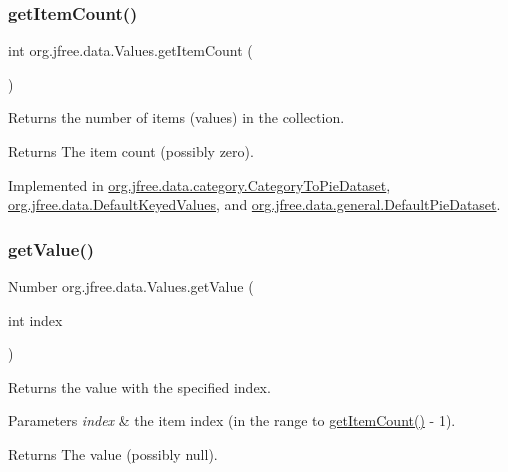 \subsubsection{\texorpdfstring{get\+Item\+Count()}{getItemCount()}}
{\footnotesize\ttfamily int org.\+jfree.\+data.\+Values.\+get\+Item\+Count (\begin{DoxyParamCaption}{ }\end{DoxyParamCaption})}

Returns the number of items (values) in the collection.

\begin{DoxyReturn}{Returns}
The item count (possibly zero). 
\end{DoxyReturn}


Implemented in \mbox{\hyperlink{classorg_1_1jfree_1_1data_1_1category_1_1_category_to_pie_dataset_a7536f863e26d692f65131df0ed9150c3}{org.\+jfree.\+data.\+category.\+Category\+To\+Pie\+Dataset}}, \mbox{\hyperlink{classorg_1_1jfree_1_1data_1_1_default_keyed_values_a82166915731034d230c83ee87177cd3b}{org.\+jfree.\+data.\+Default\+Keyed\+Values}}, and \mbox{\hyperlink{classorg_1_1jfree_1_1data_1_1general_1_1_default_pie_dataset_a4cf186a9f52bd58498c9f8551f0b5957}{org.\+jfree.\+data.\+general.\+Default\+Pie\+Dataset}}.

\mbox{\label{interfaceorg_1_1jfree_1_1data_1_1_values_a660d7e60de9e6ed7a3d2c22eb6578ced}} 
\subsubsection{\texorpdfstring{get\+Value()}{getValue()}}
{\footnotesize\ttfamily Number org.\+jfree.\+data.\+Values.\+get\+Value (\begin{DoxyParamCaption}\item[{int}]{index }\end{DoxyParamCaption})}

Returns the value with the specified index.


\begin{DoxyParams}{Parameters}
{\em index} & the item index (in the range {} to {\ttfamily \mbox{\hyperlink{interfaceorg_1_1jfree_1_1data_1_1_values_afd00781dbc2e351b7a77aca9a91ca0a9}{get\+Item\+Count()}} -\/ 1}).\\
\hline
\end{DoxyParams}
\begin{DoxyReturn}{Returns}
The value (possibly {\ttfamily null}).
\end{DoxyReturn}

